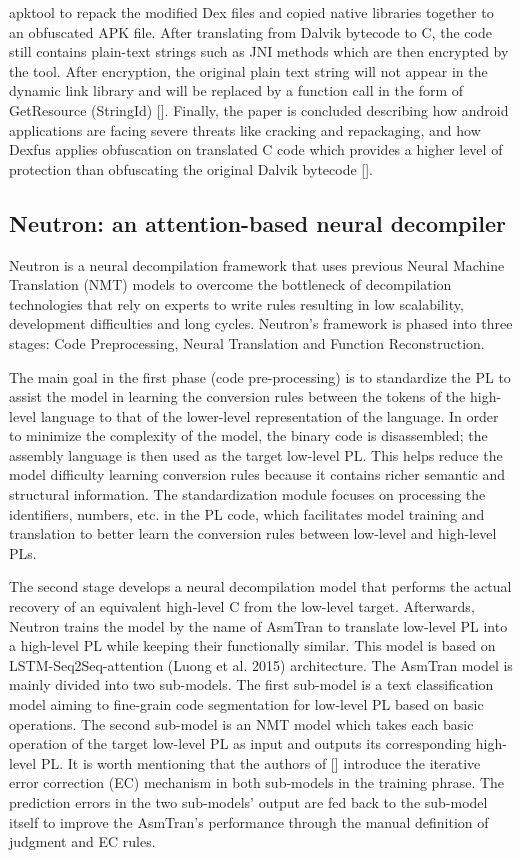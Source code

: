 \documentclass{article}
\begin{document}
apktool to repack the modified Dex files and copied native libraries together to an obfuscated APK file. After translating from Dalvik bytecode to C, the code still contains plain-text strings such as JNI methods which are then encrypted by the tool. After encryption, the original plain text string will not appear in the dynamic link library and will be replaced by a function call in the form of GetResource (StringId) [].
Finally, the paper is concluded describing how android applications are facing severe threats like cracking and repackaging, and how Dexfus applies obfuscation on translated C code which provides a higher level of protection than obfuscating the original Dalvik bytecode [].

\subsection{Neutron: an attention-based neural decompiler}

Neutron is a neural decompilation framework that uses previous Neural Machine Translation (NMT) models to overcome the bottleneck of decompilation technologies that rely on experts to write rules resulting in low scalability, development difficulties and long cycles. Neutron’s framework is phased into three stages: Code Preprocessing, Neural Translation and Function Reconstruction.

The main goal in the first phase (code pre-processing) is to standardize the PL to assist the model in learning the conversion rules between the tokens of the high-level language to that of the lower-level representation of the language. In order to minimize the complexity of the model, the binary code is disassembled; the assembly language is then used as the target low-level PL. This helps reduce the model difficulty learning conversion rules because it contains richer semantic and structural information. The standardization module focuses on processing the identifiers, numbers, etc. in the PL code, which facilitates model training and translation to better learn the conversion rules between low-level and high-level PLs.

The second stage develops a neural decompilation model that performs the actual recovery of an equivalent high-level C from the low-level target. Afterwards, Neutron trains the model by the name of AsmTran to translate low-level PL into a high-level PL while keeping their functionally similar. This model is based on LSTM-Seq2Seq-attention (Luong et al. 2015) architecture. The AsmTran model is mainly divided into two sub-models. The first sub-model is a text classification model aiming to fine-grain code segmentation for low-level PL based on basic operations. The second sub-model is an NMT model which takes each basic operation of the target low-level PL as input and outputs its corresponding high-level PL. It is worth mentioning that the authors of [] introduce the iterative error correction (EC) mechanism in both sub-models in the training phrase. The prediction errors in the two sub-models’ output are fed back to the sub-model itself to improve the AsmTran’s performance through the manual definition of judgment and EC rules.
\end{document}
